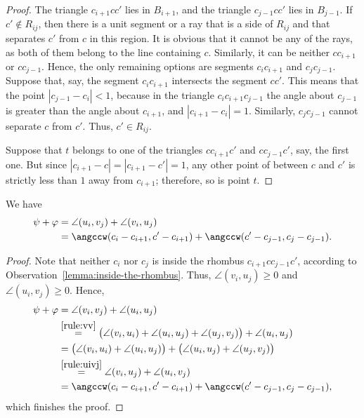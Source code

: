 \begin{enumerate}[label={\bf Case \arabic*: }, wide, labelwidth=!, labelindent=0pt]
\begin{proof}
The triangle $c_{i+1}cc'$ lies in $B_{i+1}$, and the triangle $c_{j-1}cc'$ lies in $B_{j-1}$. If $c'\notin R_{ij}$, then there is a unit segment or a ray that is a side of $R_{ij}$ and that separates $c'$ from $c$ in this region. %
It is obvious that it cannot be any of the rays, as both of them belong to the line containing $c$. Similarly, it can be neither $cc_{i+1}$ or $cc_{j-1}$. Hence, the only remaining options are segments $c_ic_{i+1}$ and $c_jc_{j-1}$. Suppose that, say, the segment $c_ic_{i+1}$ intersects the segment $cc'$.
This means that the point $|c_{j-1} - c_i| < 1$, because in the triangle $c_ic_{i+1}c_{j-1}$ the angle about $c_{j-1}$ is greater than the angle about $c_{i+1}$, and $|c_{i+1} - c_i| = 1$.
Similarly, $c_jc_{j-1}$ cannot separate $c$ from $c'$. Thus, $c'\in R_{ij}$.

Suppose that $t$ belongs to one of the triangles $cc_{i+1}c'$ and $cc_{j-1}c'$, say, the first one. But since $|c_{i+1} - c| = |c_{i+1} - c'| = 1$, any other point of between $c$ and $c'$ is strictly less than $1$ away from $c_{i+1}$; therefore, so is point $t$.
\end{proof}

\begin{observation} \label{lemma:psi-plus-phi} We have
\begin{align*}
\psi + \varphi & = \angle(u_i, v_j) + \angle(v_i, u_j) \\
& = \angccw(c_i - c_{i+1}, c' - c_{i+1}) + \angccw(c' - c_{j-1}, c_j - c_{j-1}).    
\end{align*}

\end{observation}

\begin{proof}
Note that neither $c_i$ nor $c_j$ is inside the rhombus $c_{i+1}cc_{j-1}c'$, according to Observation~\ref{lemma:inside-the-rhombus}. Thus, $\angle(v_i, u_j)\geq 0$ and $\angle(u_i, v_j)\geq 0$. Hence,
\begin{align*}
\psi + \varphi & = \angle(v_i, v_j) + \angle(u_i, u_j) \\
&\stackrel{\ref{rule:vv}}{=} \big(\angle(v_i, u_i) + \angle(u_i, u_j) + \angle(u_j, v_j)\big) + \angle(u_i, u_j) \\
&= \big(\angle(v_i, u_i) + \angle(u_i, u_j)\big) + \big(\angle(u_i, u_j) + \angle(u_j, v_j)\big) \\
&\stackrel{\ref{rule:uivj}}{=} \angle(v_i, u_j) + \angle(u_i, v_j) \\
&= \angccw(c_i - c_{i+1}, c' - c_{i+1}) + \angccw(c' - c_{j-1}, c_j - c_{j-1}),
\end{align*}
which finishes the proof.
\end{proof}


\end{enumerate}
